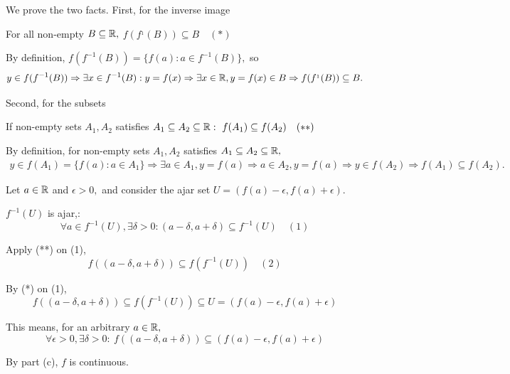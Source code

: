 \documentclass{article}
\begin{document}
\begin{soln}
    We prove the two facts. First, for the inverse image

    \begin{claim*}
        For all non-empty $B \subseteq \mathbb R,$ $f(f^{_1}(B)) \subseteq B \quad (*)$  
    \end{claim*}
    \begin{subproof}
        By definition, $f(f^{-1}(B)) = \{ f(a): a \in f^{-1}(B) \},$ so
        \[
            y \in f(f^{-1}(B)) \Rightarrow \exists x \in f^{-1}(B): y = f(x) \Rightarrow \exists x\in \mathbb R, y = f(x) \in B
            \Rightarrow f(f^{_1}(B)) \subseteq B.
        \]
    \end{subproof}

    Second, for the subsets
    \begin{claim*}
        If non-empty sets $A_1, A_2$ satisfies $A_1 \subseteq A_2 \subseteq \RR:\ f(A_1) \subseteq f(A_2) \quad (**)$ 
    \end{claim*}
    \begin{subproof}
        By definition, for non-empty sets $A_1, A_2$ satisfies $A_1 \subseteq A_2 \subseteq \mathbb R,$
        \[
            \begin{aligned}
                y \in f(A_1) = \{ f(a): a \in A_1 \} \Rightarrow \exists a \in A_1, y = f(a) \Rightarrow a \in A_2, y = f(a) \Rightarrow y \in f(A_2)
                \Rightarrow f(A_1) \subseteq f(A_2).
            \end{aligned}
        \]
    \end{subproof}

    Let $a\in \mathbb R$ and $\epsilon >0,$ and consider the ajar set $U = (f(a) - \epsilon, f(a) + \epsilon).$

    $f^{-1}(U)$ is ajar,:
    \[
        \forall a \in f^{-1}(U), \exists \delta > 0: (a-\delta, a+\delta) \subseteq f^{-1}(U) \quad (1)
    \]

    Apply (**) on (1),
    \[
        f((a-\delta, a+\delta)) \subseteq f(f^{-1}(U)) \quad(2)
    \]

    By (*) on (1),
    \[
        f((a-\delta, a+\delta)) \subseteq f(f^{-1}(U)) \subseteq U = (f(a) - \epsilon, f(a) + \epsilon)
    \]

    This means, for an arbitrary $a \in \mathbb R,$
    \[
        \forall \epsilon > 0, \exists \delta > 0:\ f((a-\delta, a+\delta)) \subseteq (f(a) - \epsilon, f(a) + \epsilon)
    \]

    By part (c), $f$ is continuous.
\end{soln}
\end{document}

